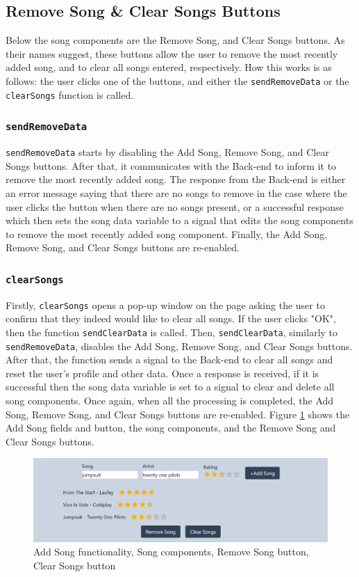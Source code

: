 \documentclass{l4proj}
\begin{document}
\subsection{Remove Song \& Clear Songs Buttons}
Below the song components are the Remove Song, and Clear Songs buttons. As their names suggest, these buttons allow the user to remove the most recently added song, and to clear all songs entered, respectively. How this works is as follows: the user clicks one of the buttons, and either the \texttt{sendRemoveData} or the \texttt{clearSongs} function is called.
\subsubsection{\texttt{sendRemoveData}}
\texttt{sendRemoveData} starts by disabling the Add Song, Remove Song, and Clear Songs buttons. After that, it communicates with the Back-end to inform it to remove the most recently added song. The response from the Back-end is either an error message saying that there are no songs to remove in the case where the user clicks the button when there are no songs present, or a successful response which then sets the song data variable to a signal that edits the song components to remove the most recently added song component. Finally, the Add Song, Remove Song, and Clear Songs buttons are re-enabled.
\subsubsection{\texttt{clearSongs}}
Firstly, \texttt{clearSongs} opens a pop-up window on the page asking the user to confirm that they indeed would like to clear all songs. If the user clicks "OK", then the function \texttt{sendClearData} is called. Then, \texttt{sendClearData}, similarly to \texttt{sendRemoveData}, disables the Add Song, Remove Song, and Clear Songs buttons. After that, the function sends a signal to the Back-end to clear all songs and reset the user's profile and other data. Once a response is received, if it is successful then the song data variable is set to a signal to clear and delete all song components. Once again, when all the processing is completed, the Add Song, Remove Song, and Clear Songs buttons are re-enabled. Figure \ref{fig:topcomps} shows the Add Song fields and button, the song components, and the Remove Song and Clear Songs buttons.
\begin{figure}
    \centering
    \includegraphics[width=1.0\linewidth]{images/topcomps.png}
    \caption{Add Song functionality, Song components, Remove Song button, Clear Songs button}
    \label{fig:topcomps}
\end{figure}
\end{document}
